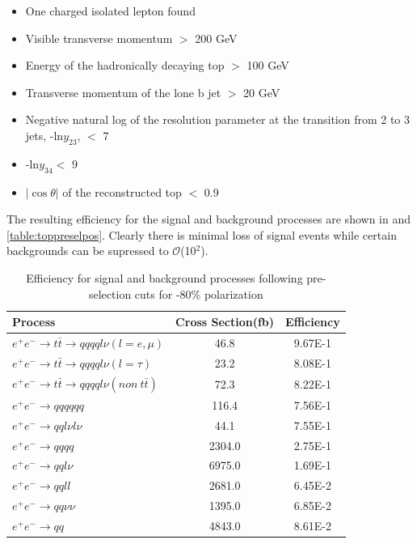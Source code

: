 \begin{itemize}
\item One charged isolated lepton found
\item Visible transverse momentum $>$ 200 GeV
\item Energy of the hadronically decaying top $>$ 100 GeV
\item Transverse momentum of the lone b jet $>$ 20 GeV
\item Negative natural log of the resolution parameter at the transition from 2 to 3 jets, -ln$y_{23}$, $<$ 7
\item -ln$y_{34} <$ 9
\item $|\cos\theta|$ of the reconstructed top $<$ 0.9
\end{itemize}

The resulting efficiency for the signal and background processes are shown in  and \ref{table:toppreselpos}. Clearly there is minimal loss of signal events while certain backgrounds can be supressed to $\mathcal{O}$(10$^2$).

\begin{table}
  \centering
  \begin{tabular}{l | c | c }
    \toprule
    Process     & Cross Section(fb) & Efficiency  \\
     \midrule
     $e^+e^-\rightarrow t\bar{t} \rightarrow qqqql\nu (l=e,\mu)$& 46.8 & 9.67E-1 \\
    \midrule
    $e^+e^-\rightarrow t\bar{t} \rightarrow qqqql\nu (l=\tau)$& 23.2 & 8.08E-1 \\
    \midrule
    $e^+e^-\rightarrow t\bar{t} \rightarrow qqqql\nu (non ~ t\bar{t})$& 72.3 & 8.22E-1\\
    \midrule
    $e^+e^-\rightarrow qqqqqq$ & 116.4 &  7.56E-1\\
    \midrule
    $e^+e^-\rightarrow qql\nu l\nu$ & 44.1 &  7.55E-1\\
    \midrule
    $e^+e^-\rightarrow qqqq$ & 2304.0 &  2.75E-1\\
    \midrule
    $e^+e^-\rightarrow qql\nu$ & 6975.0 &  1.69E-1\\
    \midrule
    $e^+e^-\rightarrow qqll$ & 2681.0 &  6.45E-2\\
    \midrule
    $e^+e^-\rightarrow qq\nu\nu$ & 1395.0 &  6.85E-2\\
    \midrule
    $e^+e^-\rightarrow qq$ & 4843.0 & 8.61E-2\\
    \bottomrule
  \end{tabular}
  \caption{Efficiency for signal and background processes following pre-selection cuts for -80\% polarization}
  \label{table:toppreselneg}
\end{table}

